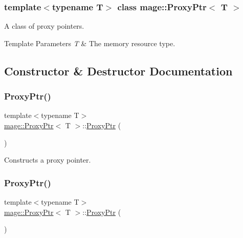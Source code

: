 \subsubsection*{template$<$typename T$>$\newline
class mage\+::\+Proxy\+Ptr$<$ T $>$}

A class of proxy pointers.


\begin{DoxyTemplParams}{Template Parameters}
{\em T} & The memory resource type. \\
\hline
\end{DoxyTemplParams}


\subsection{Constructor \& Destructor Documentation}
\mbox{\label{classmage_1_1_proxy_ptr_a6fadf61cdc71e1d6bc9ac666eda5d2c6}} 
\subsubsection{\texorpdfstring{Proxy\+Ptr()}{ProxyPtr()}\hspace{0.1cm}{\footnotesize\ttfamily [1/8]}}
{\footnotesize\ttfamily template$<$typename T$>$ \\
\mbox{\hyperlink{classmage_1_1_proxy_ptr}{mage\+::\+Proxy\+Ptr}}$<$ T $>$\+::\mbox{\hyperlink{classmage_1_1_proxy_ptr}{Proxy\+Ptr}} (\begin{DoxyParamCaption}{ }\end{DoxyParamCaption})\hspace{0.3cm}{\ttfamily [noexcept]}}

Constructs a proxy pointer. \mbox{\label{classmage_1_1_proxy_ptr_aaad9140d67d5c0a8694e94973234676a}} 
\subsubsection{\texorpdfstring{Proxy\+Ptr()}{ProxyPtr()}\hspace{0.1cm}{\footnotesize\ttfamily [2/8]}}
{\footnotesize\ttfamily template$<$typename T$>$ \\
\mbox{\hyperlink{classmage_1_1_proxy_ptr}{mage\+::\+Proxy\+Ptr}}$<$ T $>$\+::\mbox{\hyperlink{classmage_1_1_proxy_ptr}{Proxy\+Ptr}} (\begin{DoxyParamCaption}\item[{std\+::nullptr\+\_\+t}]{ }\end{DoxyParamCaption})\hspace{0.3cm}{\ttfamily [noexcept]}}

